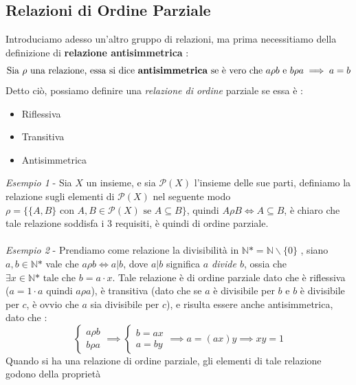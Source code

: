 \documentclass[12pt, letterpaper]{article}
\begin{document}
\subsection{Relazioni di Ordine Parziale}
Introduciamo adesso un'altro gruppo di relazioni, ma prima necessitiamo della definizione di \textbf{relazione antisimmetrica} :
\begin{equation}
    \text{Sia }\rho \text{ una relazione, essa si dice \textbf{antisimmetrica} se è vero che } a\rho b \text{ e } b\rho a \implies a=b 
\end{equation}
Detto ciò, possiamo definire una \textit{relazione di ordine} parziale se essa è :\begin{itemize}
    \item Riflessiva
    \item Transitiva
    \item Antisimmetrica
\end{itemize}
\textit{Esempio 1} - Sia \(X\) un insieme, e sia \(\mathcal{P} (X)\) l'insieme delle sue parti, definiamo 
la relazione sugli elementi di \(\mathcal{P} (X)\) nel seguente modo \(\rho = \{\{A,B\} \text{ con } A,B\in\mathcal{P}(X) \text{ se } A\subseteq B\}\),
quindi \(A\rho B \iff A\subseteq B\), è chiaro che tale relazione soddisfa i 3 requisiti, è quindi 
di ordine parziale.\\\hphantom{.}\\
\textit{Esempio 2} - Prendiamo come relazione la divisibilità in \(\mathbb{N}\text{*} = \mathbb{N}\backslash \{0\}\)  
, siano \(a,b \in \mathbb{N}\text{*}\) vale che \(a\rho b\iff a | b\), dove \(a|b\) significa \textit{ \(a\) divide \(b\)},
ossia che \(\exists x \in \mathbb{N}\text{*} \text{ tale che } b=a\cdot x\). Tale relazione è di ordine parziale 
dato che è riflessiva (\(a=1\cdot a\) quindi \(a\rho a\)), è transitiva (dato che se \(a\) è divisibile per \(b\)
e \(b\) è divisibile per \(c\), è ovvio che \(a\) sia divisibile per \(c\)), e risulta essere anche 
antisimmetrica, dato che : 
\begin{equation}
     \begin{cases} 
        a\rho b\\
        b\rho a 
     \end{cases}
     \implies 
     \begin{cases} 
        b=ax\\
        a=by 
     \end{cases}
     \implies a = (ax)y \implies xy = 1
\end{equation}
Quando si ha una relazione di ordine parziale, gli elementi di tale relazione godono della proprietà 
\end{document}
